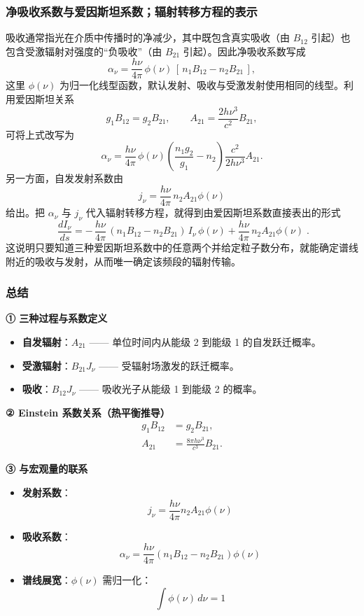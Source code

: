 \subsubsection{净吸收系数与爱因斯坦系数；辐射转移方程的表示}


吸收通常指光在介质中传播时的净减少，其中既包含真实吸收（由 $B_{12}$ 引起）也包含受激辐射对强度的“负吸收”（由 $B_{21}$ 引起）。因此净吸收系数写成
\[
\alpha_\nu=\frac{h\nu}{4\pi}\,\phi(\nu)\,[\,n_1B_{12}-n_2B_{21}\,],
\]
这里 $\phi(\nu)$ 为归一化线型函数，默认发射、吸收与受激发射使用相同的线型。利用爱因斯坦关系
\[
g_1B_{12}=g_2B_{21},\qquad A_{21}=\frac{2h\nu^3}{c^2}B_{21},
\]
可将上式改写为
\[
\alpha_\nu=\frac{h\nu}{4\pi}\,\phi(\nu)\left(\frac{n_1g_2}{g_1}-n_2\right)\frac{c^2}{2h\nu^3}A_{21}.
\]
另一方面，自发发射系数由
\[
j_\nu=\frac{h\nu}{4\pi}\,n_2A_{21}\phi(\nu)
\]
给出。把 $\alpha_\nu$ 与 $j_\nu$ 代入辐射转移方程，就得到由爱因斯坦系数直接表出的形式
\[
\boxed{\;
\frac{dI_\nu}{ds}
= -\,\frac{h\nu}{4\pi}\,(n_1B_{12}-n_2B_{21})\,I_\nu\,\phi(\nu)
+ \frac{h\nu}{4\pi}\,n_2A_{21}\phi(\nu)\; }.
\]
这说明只要知道三种爱因斯坦系数中的任意两个并给定粒子数分布，就能确定谱线附近的吸收与发射，从而唯一确定该频段的辐射传输。

\subsubsection{总结}

\vspace{0.5em}
\noindent\textbf{① 三种过程与系数定义}
\begin{itemize}
  \item \textbf{自发辐射}：$A_{21}$ —— 单位时间内从能级 2 到能级 1 的自发跃迁概率。
  \item \textbf{受激辐射}：$B_{21} J_\nu$ —— 受辐射场激发的跃迁概率。
  \item \textbf{吸收}：$B_{12} J_\nu$ —— 吸收光子从能级 1 到能级 2 的概率。
\end{itemize}

\vspace{0.5em}
\noindent\textbf{② Einstein 系数关系（热平衡推导）}
\[
\boxed{
\begin{aligned}
g_1 B_{12} &= g_2 B_{21}, \\[4pt]
A_{21} &= \frac{8\pi h\nu^3}{c^3} B_{21}.
\end{aligned}
}
\]

\vspace{0.5em}
\noindent\textbf{③ 与宏观量的联系}
\begin{itemize}
  \item \textbf{发射系数}：
  \[
  j_\nu = \frac{h\nu}{4\pi} n_2 A_{21} \phi(\nu)
  \]
  \item \textbf{吸收系数}：
  \[
  \alpha_\nu = \frac{h\nu}{4\pi} (n_1 B_{12} - n_2 B_{21}) \phi(\nu)
  \]
  \item \textbf{谱线展宽}：$\phi(\nu)$ 需归一化：
  \[
  \int \phi(\nu)\, d\nu = 1
  \]
\end{itemize}

